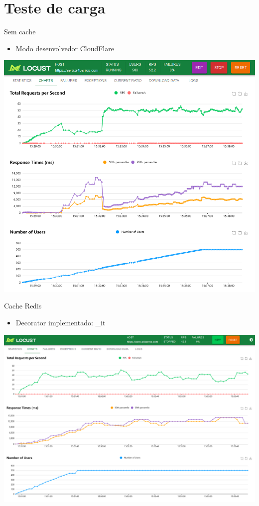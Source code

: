 \documentclass{beamer}
\begin{document}
\section{Teste de carga}

\begin{frame}{Sem cache}
    \begin{itemize}
        \item Modo desenvolvedor CloudFlare
    \end{itemize}    

    \begin{center}
        \includegraphics[width=0.6\linewidth]{img/locust-no-cache.png}
    \end{center}
\end{frame}

\begin{frame}{Cache Redis}
    \begin{itemize}
        \item Decorator implementado: \@cache\_it
    \end{itemize}

    \begin{center}
    \includegraphics[width=0.6\linewidth]{img/locust-cache-redis.png}
    \end{center}
\end{frame}
\end{document}
